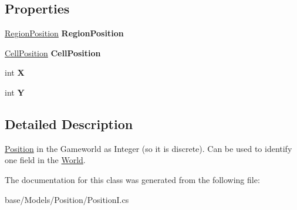 \subsection*{Properties}
\begin{DoxyCompactItemize}
\item 
\hypertarget{classCore_1_1Models_1_1PositionI_a0662e0b43f175a5320f043298984659b}{\hyperlink{classCore_1_1Models_1_1RegionPosition}{Region\-Position} {\bfseries Region\-Position}}\label{classCore_1_1Models_1_1PositionI_a0662e0b43f175a5320f043298984659b}

\item 
\hypertarget{classCore_1_1Models_1_1PositionI_a205a6a5cdd2e73781c2adf0b370402a9}{\hyperlink{classCore_1_1Models_1_1CellPosition}{Cell\-Position} {\bfseries Cell\-Position}}\label{classCore_1_1Models_1_1PositionI_a205a6a5cdd2e73781c2adf0b370402a9}

\item 
\hypertarget{classCore_1_1Models_1_1PositionI_a2612b865ceba85b37714a5d19a0228c5}{int {\bfseries X}}\label{classCore_1_1Models_1_1PositionI_a2612b865ceba85b37714a5d19a0228c5}

\item 
\hypertarget{classCore_1_1Models_1_1PositionI_ae8a742f3f984a83b3fc7706a2c9ed254}{int {\bfseries Y}}\label{classCore_1_1Models_1_1PositionI_ae8a742f3f984a83b3fc7706a2c9ed254}

\end{DoxyCompactItemize}


\subsection{Detailed Description}
\hyperlink{classCore_1_1Models_1_1Position}{Position} in the Gameworld as Integer (so it is discrete). Can be used to identify one field in the \hyperlink{classCore_1_1Models_1_1World}{World}. 



The documentation for this class was generated from the following file\-:\begin{DoxyCompactItemize}
\item 
base/\-Models/\-Position/Position\-I.\-cs\end{DoxyCompactItemize}

